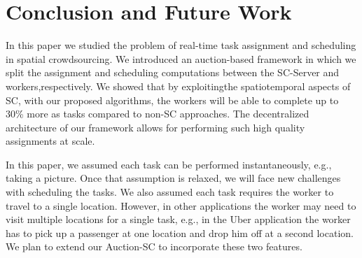 \section{Conclusion and Future Work}
\label{sec:future}

In this paper we studied the problem of real-time task assignment and scheduling in spatial crowdsourcing. We introduced an auction-based framework in which we split the assignment and scheduling computations between the SC-Server and workers,respectively. We showed that by exploitingthe spatiotemporal aspects of SC, with our proposed algorithms, the workers will be able to complete up to 30\% more as tasks compared to non-SC approaches. The decentralized architecture of our framework allows for performing such high quality assignments at scale.

In this paper, we assumed each task can be performed instantaneously, e.g., taking a picture. Once that assumption is relaxed, we will face new challenges with scheduling the tasks. We also assumed each task requires the worker to travel to a single location. However, in other applications the worker may need to visit multiple locations for a single task, e.g., in the Uber application the worker has to pick up a passenger at one location and drop him off at a second location. We plan to extend our Auction-SC to incorporate these two features.